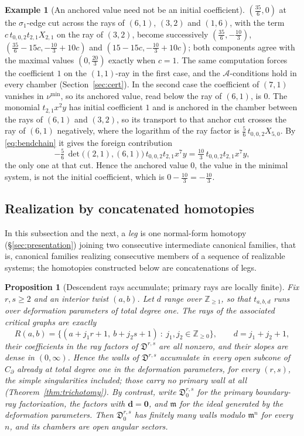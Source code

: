 \documentclass[11pt]{amsart}
\newtheorem{proposition}[theorem]{Proposition}
\theoremstyle{definition}
\newtheorem{example}[theorem]{Example}
\theoremstyle{remark}
\newcommand{\ZZ}{\mathbb{Z}}
\newcommand{\Dscr}{\mathfrak{D}}
\newcommand{\Ascr}{\mathcal{A}}
\begin{document}
\begin{example}[An anchored value need not be an initial coefficient]
$(\tfrac{35}6,0)$ at the $\sigma_1$-edge cut across the rays of $(6,1)$,
$(3,2)$ and $(1,6)$, with the term $c\,t_{0,0,2}t_{2,1}X_{2,1}$ on the ray of
$(3,2)$, become successively $(\tfrac{35}6,-\tfrac{10}3)$,
$(\tfrac{35}6-15c,-\tfrac{10}3+10c)$ and $(15-15c,-\tfrac{10}3+10c)$; both
components agree with the maximal values $(0,\tfrac{20}3)$ exactly when
$c=1$.  The same computation forces the coefficient $1$ on the $(1,1)$-ray in
the first case, and the $\Ascr$-conditions hold in every chamber
(Section~\ref{sec:cert}).
In the second
case the coefficient of $(7,1)$ vanishes in $\nu^{\min}$, so its anchored value, read below the ray of
$(6,1)$, is $0$.  The monomial $t_{2,1}x^2y$ has initial coefficient $1$ and
is anchored in the chamber between the rays of $(6,1)$ and $(3,2)$, so its
transport to that anchor cut crosses the ray of $(6,1)$ negatively, where the
logarithm of the ray factor is $\tfrac56\,t_{0,0,2}X_{5,0}$.  By \eqref{eq:bendchain} it
gives the foreign contribution
\[
-\tfrac56\,\det\bigl((2,1),(6,1)\bigr)\,t_{0,0,2}t_{2,1}x^{7}y
=\tfrac{10}{3}\,t_{0,0,2}t_{2,1}x^{7}y,
\]
the only one at that cut.  Hence the anchored value $0$, the value in the
minimal system, is not the initial coefficient, which is
$0-\tfrac{10}{3}=-\tfrac{10}{3}$.
\end{example}


\subsection{Realization by concatenated homotopies}
\label{ssec:realization}

In this subsection and the next, a \emph{leg} is one normal-form homotopy
(\S\ref{sec:presentation}) joining two consecutive intermediate canonical
families, that is, canonical families realizing consecutive members of a
sequence of realizable systems; the homotopies constructed below are
concatenations of legs.

\begin{proposition}[Descendent rays accumulate; primary rays are locally finite]
\label{prop:localfinite}
Fix $r,s\ge2$ and an interior twist $(a,b)$. Let $d$ range over $\ZZ_{\ge1}$, so that $t_{a,b,d}$ runs over deformation
parameters of total degree one. The rays of the associated critical graphs are
exactly
\[
R(a,b)=\bigl\{(a+j_1r+1,\ b+j_2s+1)\ :\ j_1,j_2\in\ZZ_{\ge0}\bigr\},
\qquad d=j_1+j_2+1,
\]
their coefficients in the ray factors of $\Dscr^{r,s}$ are all nonzero, and
their slopes are dense
in $(0,\infty)$. Hence the walls of $\Dscr^{r,s}$
accumulate in every open subcone of $C_\partial$ already at total degree one
in the deformation parameters, for every $(r,s)$, the simple singularities
included; those carry no primary wall at all (Theorem~\ref{thm:trichotomy}). By contrast, write
$\Dscr^{r,s}_{0}$ for the \emph{primary boundary-ray factorization}, the factors with
$\mathbf d=\mathbf 0$, and $\mathfrak m$ for the ideal generated by the
deformation parameters. Then $\Dscr^{r,s}_{0}$ has finitely many walls modulo
$\mathfrak m^{n}$ for every $n$, and its chambers are open angular sectors.
\end{proposition}
\end{document}
